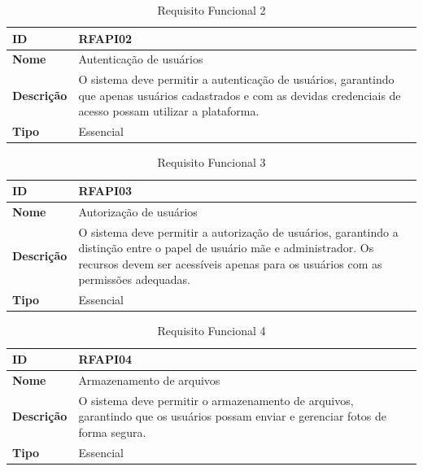 \begin{table}[H]
\centering
\begin{tabular}{|l|p{12cm}|}
\hline
\textbf{ID} & RFAPI02 \\
\hline
\textbf{Nome} & Autenticação de usuários \\
\hline
\textbf{Descrição} & O sistema deve permitir a autenticação de usuários, garantindo que apenas usuários cadastrados e com as devidas credenciais de acesso possam utilizar a plataforma. \\
\hline
\textbf{Tipo} & Essencial \\
\hline
\end{tabular}
\caption[RFAPI02 -- Autenticação de usuários]{Requisito Funcional 2}
\label{tab:rfapi02}
\end{table}

\begin{table}[H]
\centering
\begin{tabular}{|l|p{12cm}|}
\hline
\textbf{ID} & RFAPI03 \\
\hline
\textbf{Nome} & Autorização de usuários \\
\hline
\textbf{Descrição} & O sistema deve permitir a autorização de usuários, garantindo a distinção entre o papel de usuário mãe e administrador. Os recursos devem ser acessíveis apenas para os usuários com as permissões adequadas. \\
\hline
\textbf{Tipo} & Essencial \\
\hline
\end{tabular}
\caption[RFAPI03 -- Autorização de usuários]{Requisito Funcional 3}
\label{tab:rfapi03}
\end{table}

\begin{table}[H]
\centering
\begin{tabular}{|l|p{12cm}|}
\hline
\textbf{ID} & RFAPI04 \\
\hline
\textbf{Nome} & Armazenamento de arquivos \\
\hline
\textbf{Descrição} & O sistema deve permitir o armazenamento de arquivos, garantindo que os usuários possam enviar e gerenciar fotos de forma segura. \\
\hline
\textbf{Tipo} & Essencial \\
\hline
\end{tabular}
\caption[RFAPI04 -- Armazenamento de arquivos]{Requisito Funcional 4}
\label{tab:rfapi04}
\end{table}

